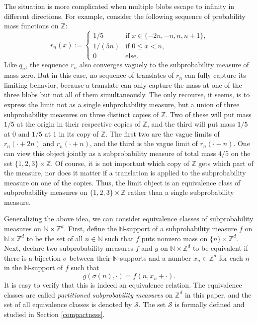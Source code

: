 \documentclass[11pt,reqno]{amsart}
\numberwithin{equation}{section}
\theoremstyle{definition}
\begin{document}
The situation is more complicated when multiple blobs escape to infinity in different directions. For example, consider the following sequence of probability mass functions on $\mathbb{Z}$:
\[
r_n(x) :=
\begin{cases}
1/5 &\text{if $x \in \{-2n, -n, n, n+1\}$,}\\
1/(5n) &\text{if $0\le x<n$,}\\
0 &\text{else.}
\end{cases}
\]
Like $q_n$, the sequence $r_n$ also converges vaguely 
to the subprobability measure of mass zero. But in this case, no sequence of translates of $r_n$ can fully capture its limiting behavior, because a translate can only capture the mass at one of the three blobs but not all of them simultaneously.  The only recourse, it seems, is to express the limit not as a single subprobability measure, but a union of three subprobability measures on three distinct copies of $\mathbb{Z}$. Two of these will put mass $1/5$ at the origin in their respective copies of ${\mathbb{Z}}$, and the third will put mass $1/5$ at $0$ and $1/5$ at $1$ in its copy of ${\mathbb{Z}}$. 
The first two are the vague 
limits of $r_n(\cdot +2n)$ and $r_n(\cdot + n)$, and the third is the vague 
limit of $r_n(\cdot - n)$. One can view this object jointly as a subprobability measure of total mass $4/5$ on the set $\{1,2,3\}\times {\mathbb{Z}}$. Of course, it is not important which copy of ${\mathbb{Z}}$ gets which part of the measure, nor does it matter if a translation is applied to the subprobability measure on one of the copies. Thus, the limit object is an equivalence class of subprobability measures on $\{1,2,3\}\times {\mathbb{Z}}$ rather than a single subprobability measure.

Generalizing the above idea, we can consider equivalence classes of subprobability measures on ${\mathbb{N}} \times {\mathbb{Z}}^d$. First, define the ${\mathbb{N}}$-support of a subprobability measure $f$ on ${\mathbb{N}}\times {\mathbb{Z}}^d$ to be the set of all $n\in {\mathbb{N}}$ such that $f$ puts nonzero mass on $\{n\}\times {\mathbb{Z}}^d$. Next, declare two subprobability measures $f$ and $g$ on ${\mathbb{N}} \times {\mathbb{Z}}^d$ to be equivalent if there is a bijection $\sigma$ between their ${\mathbb{N}}$-supports and a number $x_n\in {\mathbb{Z}}^d$ for each $n$ in the ${\mathbb{N}}$-support of $f$ such that 
\[
g(\sigma(n), \cdot) = f(n, x_n +\cdot).
\]
It is easy to verify that this is indeed an equivalence relation. The equivalence classes are called \textit{partitioned subprobability measures} on ${\mathbb{Z}}^d$ in this paper, and the set of all equivalence classes is denoted by ${\mathcal{S}}$. The set ${\mathcal{S}}$ is formally defined and studied in Section \ref{compactness}.
\end{document}

